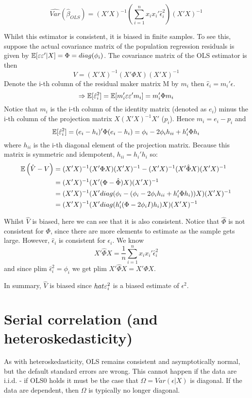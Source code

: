 \documentclass[DIV=14,titlepage=false]{scrreprt}
\begin{document}
\begin{definition}
    \[\widehat{Var}(\hat\beta_{OLS}) = (X'X)^{-1}\left(\sum_{i=1}^{n}x_ix_i'\hat \epsilon_i ^2 \right)(X'X)^{-1} \]
\end{definition}
\begin{note}
Whilst this estimator is consistent, it is biased in finite samples. To see this, suppose the actual covariance matrix of the population regression residuals is given by $\E[\epsilon \epsilon'|X] = \Phi = diag(\phi_i)$. The covariance matrix of the OLS estimator is then \[V=(X'X)^{-1}(X'\Phi X) (X'X)^{-1}\] Denote the i-th column of the residual maker matrix M by $m_i$ then $\hat \epsilon_i = m_i ' \epsilon$. 
\[ \implies \E[\hat \epsilon_i^2] = \E[m_i' \epsilon \epsilon' m_i] = m_i'\Phi m_i \]
Notice that $m_i$ is the i-th column of the identity matrix (denoted as $e_i$) minus the i-th column of the projection matrix $X(X'X)^{-1}X'$ ($p_i$). Hence $m_i=e_i - p_i$ and 
\[ \E[\hat \epsilon_i^2] = (e_i-h_i)'\Phi (e_i-h_i) = \phi_i - 2\phi_i h_{ii}+h_i'\Phi h_i \]
where $h_{ii}$ is the i-th diagonal element of the projection matrix. Because this matrix is symmetric and idempotent, $h_{ii} = h_i'h_i$ so: 
\begin{align*}
    \E\left(\hat V - V\right) &= (X'X)^{-1}(X'\Phi X) (X'X)^{-1} - (X'X)^{-1}(X' \hat \Phi X) (X'X)^{-1}\\
    &= (X'X)^{-1}(X'(\Phi-\hat \Phi) X) (X'X)^{-1}\\
    &= (X'X)^{-1}(X' diag(\phi_i - (\phi_i - 2\phi_i h_{ii}+h_i'\Phi h_i) ) X) (X'X)^{-1}\\
    &= (X'X)^{-1}(X'diag(h_i'(\Phi - 2\phi_iI)h_i)X) (X'X)^{-1}
\end{align*}


Whilst $\hat V$ is biased, here we can see that it is also consistent. Notice that $ \hat \Phi $ is not consistent for $\Phi$, since there are more elements to estimate as the sample gets large. However, $\hat \epsilon_i$ is consistent for $\epsilon_i$. We know \[X'\hat \Phi X = \frac{1}{n}\sum_{i=1}^{n}  x_ix_i'\hat \epsilon_i^2 \] and since plim $\hat \epsilon_i ^2 = \phi_i$ we get plim $X'\hat \Phi X = X' \Phi X$.

In summary, $\hat V$ is biased since $\\hat\epsilon^2_i$ is a biased estimate of $\epsilon^2$.
\end{note}

\section{Serial correlation (and heteroskedasticity)}
As with heteroskedasticity, OLS remains consistent and asymptotically normal, but the default standard errors are wrong. This cannot happen if the data are i.i.d. - if OLS0 holds it must be the case that $\Omega = Var(\epsilon|X)$ is diagonal. If the data are dependent, then $\Omega$ is typically no longer diagonal.
\end{document}
